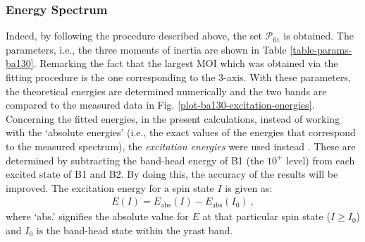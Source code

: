 \subsubsection{Energy Spectrum}

Indeed, by following the procedure described above, the set $\mathcal{P}_\text{fit}$ is obtained. The parameters, i.e., the three moments of inertia are shown in Table \ref{table-params-ba130}. Remarking the fact that the largest MOI which was obtained via the fitting procedure is the one corresponding to the $3$-axis. With these parameters, the theoretical energies are determined numerically and the two bands are compared to the measured data in Fig. \ref{plot-ba130-excitation-energies}. Concerning the fitted energies, in the present calculations, instead of working with the `absolute energies' (i.e., the exact values of the energies that correspond to the measured spectrum), the \emph{excitation energies} were used instead \cite{raduta2017semiclassical,raduta2018wobbling,raduta2020towards}. These are determined by subtracting the band-head energy of B1 (the $10^+$ level) from each excited state of B1 and B2. By doing this, the accuracy of the results will be improved. The excitation energy for a spin state $I$ is given as:
\begin{align}
    E(I)=E_\text{abs}(I)-E_\text{abs}(I_0)\ ,
    \label{excitation-energy-general-formula}
\end{align}
where `abs.' signifies the absolute value for $E$ at that particular spin state ($I\geq I_0$) and $I_0$ is the band-head state within the yrast band.

\begin{table}
    \centering
    \caption{The parameter set $\mathcal{P}_\text{fit}$ obtained from the fitting procedure of the excitation energies of the two wobbling bands (B1 and B2) for $^{130}$Ba. The model function corresponds to the energy of a simple wobbler (see Eq. \ref{eq-wobbling-energy-evenA}).}
    \label{table-params-ba130}
\end{table}

